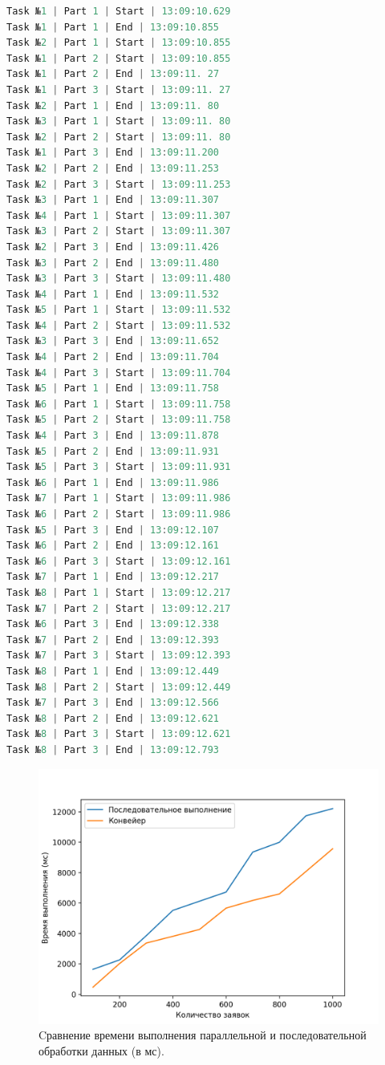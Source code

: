 \documentclass[12pt]{report}
\begin{document}
\begin{lstlisting}[label=queueTasks,caption=Лог параллельной обработки восьми заявок,language=C]
Task №1 | Part 1 | Start | 13:09:10.629
Task №1 | Part 1 | End | 13:09:10.855
Task №2 | Part 1 | Start | 13:09:10.855
Task №1 | Part 2 | Start | 13:09:10.855
Task №1 | Part 2 | End | 13:09:11. 27
Task №1 | Part 3 | Start | 13:09:11. 27
Task №2 | Part 1 | End | 13:09:11. 80
Task №3 | Part 1 | Start | 13:09:11. 80
Task №2 | Part 2 | Start | 13:09:11. 80
Task №1 | Part 3 | End | 13:09:11.200
Task №2 | Part 2 | End | 13:09:11.253
Task №2 | Part 3 | Start | 13:09:11.253
Task №3 | Part 1 | End | 13:09:11.307
Task №4 | Part 1 | Start | 13:09:11.307
Task №3 | Part 2 | Start | 13:09:11.307
Task №2 | Part 3 | End | 13:09:11.426
Task №3 | Part 2 | End | 13:09:11.480
Task №3 | Part 3 | Start | 13:09:11.480
Task №4 | Part 1 | End | 13:09:11.532
Task №5 | Part 1 | Start | 13:09:11.532
Task №4 | Part 2 | Start | 13:09:11.532
Task №3 | Part 3 | End | 13:09:11.652
Task №4 | Part 2 | End | 13:09:11.704
Task №4 | Part 3 | Start | 13:09:11.704
Task №5 | Part 1 | End | 13:09:11.758
Task №6 | Part 1 | Start | 13:09:11.758
Task №5 | Part 2 | Start | 13:09:11.758
Task №4 | Part 3 | End | 13:09:11.878
Task №5 | Part 2 | End | 13:09:11.931
Task №5 | Part 3 | Start | 13:09:11.931
Task №6 | Part 1 | End | 13:09:11.986
Task №7 | Part 1 | Start | 13:09:11.986
Task №6 | Part 2 | Start | 13:09:11.986
Task №5 | Part 3 | End | 13:09:12.107
Task №6 | Part 2 | End | 13:09:12.161
Task №6 | Part 3 | Start | 13:09:12.161
Task №7 | Part 1 | End | 13:09:12.217
Task №8 | Part 1 | Start | 13:09:12.217
Task №7 | Part 2 | Start | 13:09:12.217
Task №6 | Part 3 | End | 13:09:12.338
Task №7 | Part 2 | End | 13:09:12.393
Task №7 | Part 3 | Start | 13:09:12.393
Task №8 | Part 1 | End | 13:09:12.449
Task №8 | Part 2 | Start | 13:09:12.449
Task №7 | Part 3 | End | 13:09:12.566
Task №8 | Part 2 | End | 13:09:12.621
Task №8 | Part 3 | Start | 13:09:12.621
Task №8 | Part 3 | End | 13:09:12.793
\end{lstlisting}
\newpage
\begin{figure}[h]
	\centering
	\includegraphics[width = \linewidth]{cmp.png}
	\caption{Cравнение времени выполнения параллельной и последовательной обработки данных (в мс).}
	\label{cmp}
\end{figure}
\end{document}
